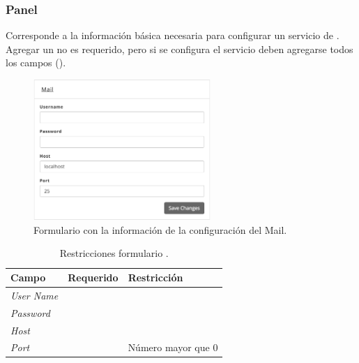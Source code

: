 \subsubsection*{Panel \mailPanel}

Corresponde a la información básica necesaria para configurar un servicio de \email. Agregar un \email no es requerido, pero si se configura el servicio deben agregarse todos los campos ().

\begin{figure}[H]
	\centering
	\includegraphics[width=0.6\textwidth]{figuras/dashboard/ecommerce/mail/menu.png}
	\caption{Formulario con la información de la configuración del Mail.}
	\label{figure:dashboard:ecommerce:mail:menu}
\end{figure}

\begin{table}[H]
    \centering
	\begin{tabular}{ |l|c||l| }
		\hline Campo & Requerido & Restricción \\ \hline
		\multirow{1}{*}{\textit{User Name}} &  {\checkmark} &  \\ \hline
		\multirow{1}{*}{\textit{Password}} 	&  {\checkmark} &  \\ \hline
		\multirow{1}{*}{\textit{Host}} 		&  {\checkmark} &  \\ \hline
		\multirow{1}{*}{\textit{Port}} 		&  {\checkmark} & Número mayor que 0 \\ \hline
		\hline
	\end{tabular}
 	\caption{Restricciones formulario \mailPanel.}
    \label{tab:dashboard:ecommerce:form:mail}
\end{table}



